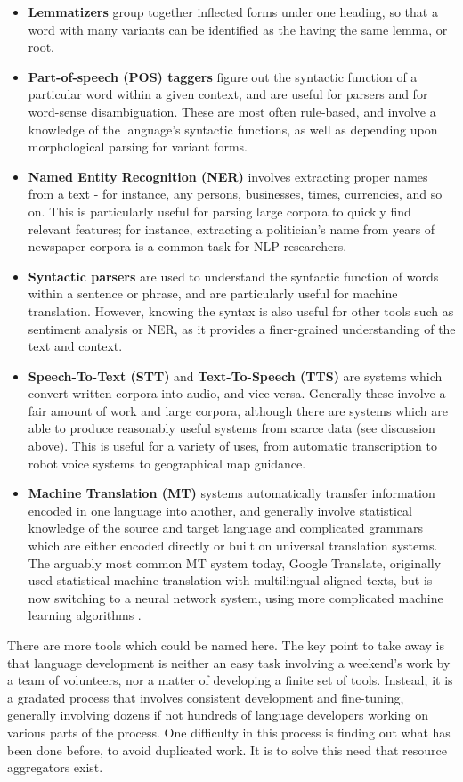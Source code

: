 \begin{itemize}
  \item \textbf{Lemmatizers} group together inflected forms under one heading, so that a word with many variants can be identified as the having the same lemma, or root.
  \item \textbf{Part-of-speech (POS) taggers} figure out the syntactic function of a particular word within a given context, and are useful for parsers and for word-sense disambiguation. These are most often rule-based, and involve a knowledge of the language's syntactic functions, as well as depending upon morphological parsing for variant forms.
  \item \textbf{Named Entity Recognition (NER)} involves extracting proper names from a text - for instance, any persons, businesses, times, currencies, and so on. This is particularly useful for parsing large corpora to quickly find relevant features; for instance, extracting a politician's name from years of newspaper corpora is a common task for NLP researchers.
  \item \textbf{Syntactic parsers} are used to understand the syntactic function of words within a sentence or phrase, and are particularly useful for machine translation. However, knowing the syntax is also useful for other tools such as sentiment analysis or NER, as it provides a finer-grained understanding of the text and context.
  \item \textbf{Speech-To-Text (STT)} and \textbf{Text-To-Speech (TTS)} are systems which convert written corpora into audio, and vice versa. Generally these involve a fair amount of work and large corpora, although there are systems which are able to produce reasonably useful systems from scarce data (see discussion above). This is useful for a variety of uses, from automatic transcription to robot voice systems to geographical map guidance.
  \item \textbf{Machine Translation (MT)} systems automatically transfer information encoded in one language into another, and generally involve statistical knowledge of the source and target language and complicated grammars which are either encoded directly or built on universal translation systems. The arguably most common MT system today, Google Translate, originally used statistical machine translation with multilingual aligned texts, but is now switching to a neural network system, using more complicated machine learning algorithms \citep{google2016google}.
\end{itemize}

There are more tools which could be named here. The key point to take away is that language development is neither an easy task involving a weekend's work by a team of volunteers, nor a matter of developing a finite set of tools. Instead, it is a gradated process that involves consistent development and fine-tuning, generally involving dozens if not hundreds of language developers working on various parts of the process. One difficulty in this process is finding out what has been done before, to avoid duplicated work. It is to solve this need that resource aggregators exist.

